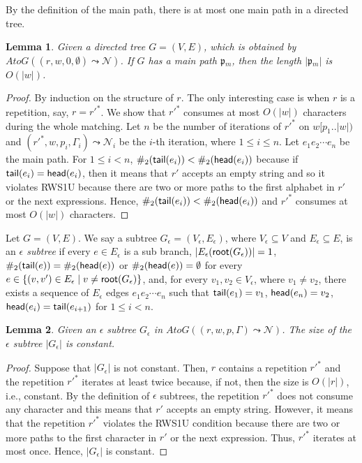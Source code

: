 \documentclass[conference]{IEEEtran}
\newcommand{\ltp}{RWS1U}
\newtheorem{lemma}{Lemma}[section]
\newcommand{\togform}{{\mathit AtoG}}
\newcommand{\groot}{{\sf root}}
\newcommand{\tail}{{\sf tail}}
\newcommand{\head}{{\sf head}}
\newcommand{\path}{\mathfrak{p}}
\begin{document}
By the definition of the main path, there is at most one main path in a directed tree.
\begin{lemma}
\label{lem:mainisconstant}
Given a directed tree $G = (V,E)$, which is obtained by $\togform{}((r,w,0,\emptyset) \leadsto{} \mathcal{N})$.
If $G$ has a main path $\path{}_m$, then the length $|\path{}_m|$ is $O(|w|)$.
\end{lemma}
\begin{proof}
By induction on the structure of $r$.
The only interesting case is when $r$ is a repetition, say, $r = {r'}^*$.
We show that ${r'}^*$ consumes at most $O(|w|)$ characters during the whole matching.
Let $n$ be the number of iterations of ${r'}^*$ on $w[p_1..|w|)$ and $({r'}^*, w, p_i, \Gamma_i) \leadsto{} \mathcal{N}_i$ be the $i$-th iteration, where $1 \leq i \leq n$.
Let $e_1 e_2 \cdots e_n$ be the main path.
For $1 \leq i < n$, $\#_2(\tail{}(e_i)) <\#_2(\head{}(e_{i}))$ because if $\tail{}(e_i) = \head{}(e_{i})$, then it means that $r'$ accepts an empty string and so it violates \ltp{} because there are two or more paths to the first alphabet in $r'$ or the next expressions.
Hence, $\#_2(\tail{}(e_i)) < \#_2(\head{}(e_{i}))$ and ${r'}^*$ consumes at most $O(|w|)$ characters.
\end{proof}


\begin{definition}
\normalfont
Let $G = (V,E)$.
We say a subtree $G_{\epsilon} = (V_{\epsilon}, E_{\epsilon})$, where $V_{\epsilon} \subseteq V$ and $E_{\epsilon} \subseteq E$, is an {\em $\epsilon$ subtree} if every $e \in E_{\epsilon}$ is a sub branch, 
$|E_\epsilon{}(\groot{}(G_\epsilon))| = 1$, 
$\#_2(\tail{}(e)) = \#_2(\head{}(e))$ or $\#_2(\head{}(e)) = \emptyset{}$ for every $e \in \{ (v,v') \in E_{\epsilon} \mid v \neq \groot(G_\epsilon) \}$, and, for every $v_1, v_2 \in V_{\epsilon}$, where $v_1 \not= v_2$, there exists a sequence of $ E_{\epsilon}$ edges $e_1 e_2 \cdots e_n$ such that $\tail{}(e_1) = v_1$, $\head{}(e_n) = v_2$, $\head{}(e_i) = \tail{}(e_{i+1})$ for $1 \leq i < n$.
\end{definition}


\begin{lemma}
\label{lem:esubtreeisconstant}
Given an $\epsilon$ subtree $G_\epsilon$ in $\togform{}((r,w,p,\Gamma) \leadsto{} \mathcal{N})$.
The size of the $\epsilon$ subtree $|G_\epsilon|$ is constant.
\end{lemma}
\begin{proof}
Suppose that $|G_\epsilon|$ is not constant. 
Then, $r$ contains a repetition ${r'}^*$ and the repetition ${r'}^*$ iterates at least twice because, if not, then the size is $O(|r|)$, i.e., constant.
By the definition of $\epsilon$ subtrees, the repetition ${r'}^*$ does not consume any character and this means that ${r'}$ accepts an empty string.
However, it means that the repetition ${r'}^*$ violates the \ltp{} condition because there are two or more paths to the first character in ${r'}$ or the next expression.
Thus, ${r'}^*$ iterates at most once.
Hence, $|G_\epsilon|$ is constant.
\end{proof}
\end{document}
